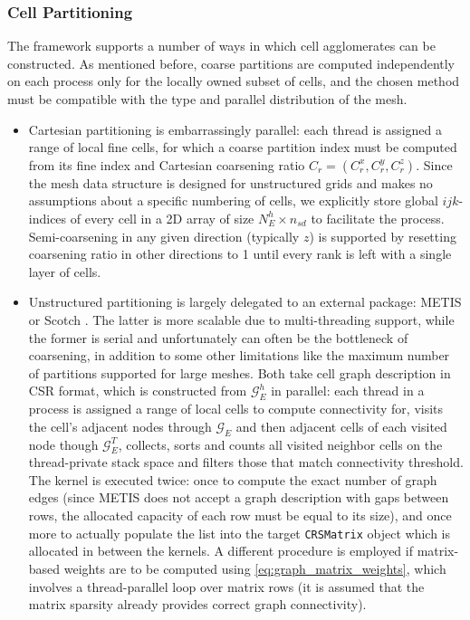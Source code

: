 \subsubsection{Cell Partitioning}
\label{subsubsec:par_kernels_coarsening_cells}

The framework supports a number of ways in which cell agglomerates can be constructed.   As mentioned before, coarse partitions are computed independently on each process only for the locally owned subset of cells, and the chosen method must be compatible with the type and parallel distribution of the mesh.
\begin{itemize}
\item Cartesian partitioning is embarrassingly parallel: each thread is assigned a range of local fine cells, for which a coarse partition index must be computed from its fine index and Cartesian coarsening ratio $C_r = (C_r^x, C_r^y, C_r^z)$.   Since the mesh data structure is designed for unstructured grids and makes no assumptions about a specific numbering of cells, we explicitly store global $ijk$-indices of every cell in a 2D array of size $N_E^h \times n_{sd}$ to facilitate the process.   Semi-coarsening in any given direction (typically $z$) is supported by resetting coarsening ratio in other directions to 1 until every rank is left with a single layer of cells.
\item Unstructured partitioning is largely delegated to an external package: METIS \cite{Karypis1999} or Scotch \cite{Chevalier2008}. The latter is more scalable due to multi-threading support, while the former is serial and unfortunately can often be the bottleneck of coarsening, in addition to some other limitations like the maximum number of partitions supported for large meshes.   Both take cell graph description in CSR format, which is constructed from $\mathcal{G}_E^h$ in parallel: each thread in a process is assigned a range of local cells to compute connectivity for, visits the cell's adjacent nodes through $\mathcal{G}_E$ and then adjacent cells of each visited node though $\mathcal{G}_E^T$, collects, sorts and counts all visited neighbor cells on the thread-private stack space and filters those that match connectivity threshold.   The kernel is executed twice: once to compute the exact number of graph edges (since METIS does not accept a graph description with gaps between rows, the allocated capacity of each row must be equal to its size), and once more to actually populate the list into the target \texttt{CRSMatrix} object which is allocated in between the kernels.   A different procedure is employed if matrix-based weights are to be computed using \cref{eq:graph_matrix_weights}, which involves a thread-parallel loop over matrix rows (it is assumed that the matrix sparsity already provides correct graph connectivity).

\end{itemize}
